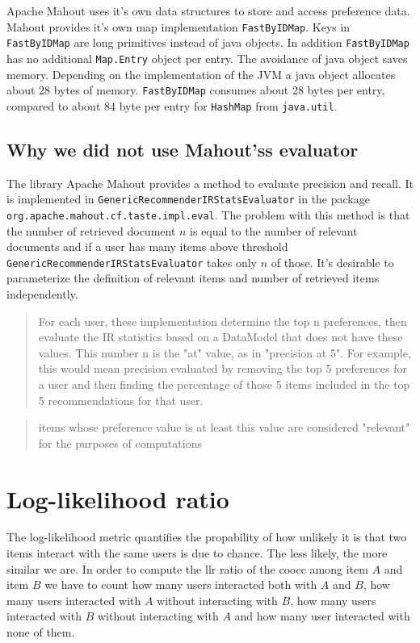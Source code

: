 \documentclass[twoside,a4paper]{article}
\begin{document}
Apache Mahout uses it's own data structures to store and access preference data. Mahout provides it's own map implementation \verb|FastByIDMap|. Keys in \verb|FastByIDMap| are long primitives instead of java objects. In addition \verb|FastByIDMap| has no additional \verb|Map.Entry| object per entry. The avoidance of java object saves memory. Depending on the implementation of the JVM a java object allocates about 28 bytes of memory. \verb|FastByIDMap| consumes about 28 bytes per entry, compared to about 84 byte per entry for \verb|HashMap| from \verb|java.util|.

\subsection{Why we did not use Mahout'ss evaluator}
\label{sec:mahouteval}

The library Apache Mahout provides a method to evaluate precision and recall. It is implemented in 
 \verb|GenericRecommenderIRStatsEvaluator| in the package \verb|org.apache.mahout.cf.taste.impl.eval|. The problem with this method is that the number of retrieved document $n$ is equal to the number of relevant documents and if a user has many items above threshold  \verb|GenericRecommenderIRStatsEvaluator| takes only $n$ of those. It's desirable to parameterize the definition of relevant items and number of retrieved items independently.

\begin{quote}
For each user, these implementation determine the top n preferences, then evaluate the IR statistics based on a DataModel that does not have these values. This number n is the "at" value, as in "precision at 5". For example, this would mean precision evaluated by removing the top 5 preferences for a user and then finding the percentage of those 5 items included in the top 5 recommendations for that user. 
\end{quote}

\begin{quote}
  items whose preference value is at least this value are considered "relevant" for the purposes of computations
\end{quote}

\section{Log-likelihood ratio}
\label{sec:llrratio}
The log-likelihood metric quantifies the propability of how
unlikely it is that two items interact with the same users is due to chance. The less likely, the more similar we are.
In order to compute the \gls{llr} ratio of the \gls{coocc} among item $A$ and item $B$ we have to count how many users interacted both with $A$ and $B$, how many users interacted with $A$ without interacting with $B$, how many users interacted with $B$ without interacting with $A$ and how many user interacted with none of them.
\end{document}
